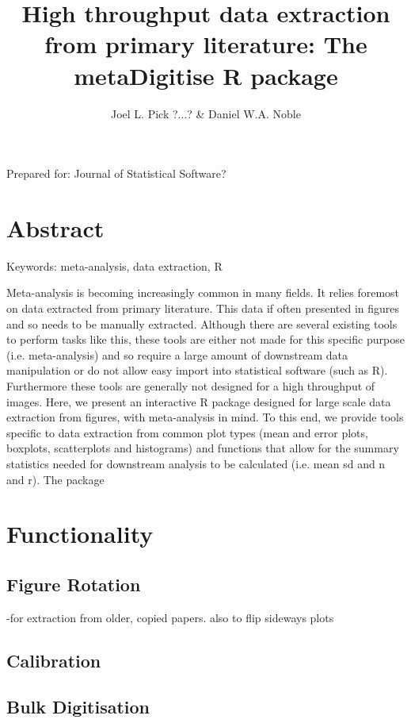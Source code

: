 \documentclass{article}
\title{High throughput data extraction from primary literature: The metaDigitise R package}
\author{Joel L. Pick ?...? \& Daniel W.A. Noble}
\begin{document}
\doublespacing
\raggedright



\maketitle
Prepared for: Journal of Statistical Software?

\section*{Abstract}

Keywords: meta-analysis, data extraction, R

\clearpage



Meta-analysis is becoming increasingly common in many fields. It relies foremost on data extracted from primary literature. This data if often presented in figures and so needs to be manually extracted. Although there are several existing tools to perform tasks like this, 
these tools are either not made for this specific purpose (i.e. meta-analysis) and so require a large amount of downstream data manipulation or do not allow easy import into statistical software (such as R). Furthermore these tools are generally not designed for a high throughput of images. 
Here, we present an interactive R package designed for large scale data extraction from figures, with meta-analysis in mind. To this end, we provide tools specific to data extraction from common plot types (mean and error plots, boxplots, scatterplots and histograms) and functions that allow for the summary statistics needed for downstream analysis to be calculated (i.e. mean sd and n and r). %
The package 





\section{Functionality}
\subsection{Figure Rotation}
-for extraction from older, copied papers. also to flip sideways plots

\subsection{Calibration}

\subsection{Bulk Digitisation}
\end{document}

